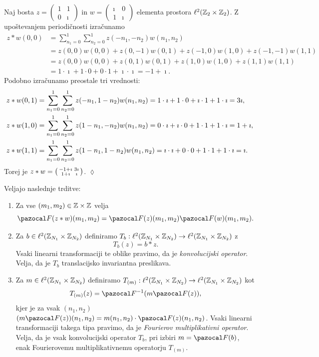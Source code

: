 \begin{primer}
Naj bosta
$z = \left(\begin{smallmatrix}
  1 & 1\\
  0 & \imath
\end{smallmatrix} \right)$
in
$w = \left(\begin{smallmatrix}
  \imath & 0\\
  1 & \imath
\end{smallmatrix} \right)$
elementa prostora $\ell^2(\mathbb Z_2 \times \mathbb Z_2)$. Z upoštevanjem periodičnosti izračunamo
%
\begin{align*}
z \ast w(0, 0) & = \sum_{n_1 = 0}^1 \sum_{n_2 = 0}^1 z(- n_1, - n_2) w(n_1, n_2) \\
& = z(0, 0) w(0, 0) + z(0, -1) w(0, 1) + z(-1, 0) w(1, 0)+ z(-1, -1) w(1, 1) \\
& = z(0, 0) w(0, 0) + z(0, 1) w(0, 1) + z(1, 0) w(1, 0)+ z(1, 1) w(1, 1) \\
& = 1 \cdot \imath + 1 \cdot 0 + 0 \cdot 1 + \imath \cdot \imath = -1 + \imath.
\end{align*}
%
Podobno izračunamo preostale tri vrednosti:
%
\begin{align*}
z \ast w(0, 1) & = \sum_{n_1 = 0}^1 \sum_{n_2 = 0}^1 z(- n_1, 1 - n_2) w(n_1, n_2) = 1 \cdot \imath + 1 \cdot 0 + \imath \cdot 1 + 1 \cdot \imath = 3\imath, \\
z \ast w(1, 0) & = \sum_{n_1 = 0}^1 \sum_{n_2 = 0}^1 z(1 - n_1, - n_2) w(n_1, n_2) = 0 \cdot \imath + \imath \cdot 0 + 1 \cdot 1 + 1 \cdot \imath = 1 + \imath, \\
z \ast w(1, 1) & = \sum_{n_1 = 0}^1 \sum_{n_2 = 0}^1 z(1 - n_1, 1 - n_2) w(n_1, n_2) = \imath \cdot \imath + 0 \cdot 0 + 1 \cdot 1 + 1 \cdot \imath = \imath.
\end{align*}
%
Torej je
$z \ast w = \left(\begin{smallmatrix}
  -1 + \imath & 3\imath\\
  1 + \imath & \imath
\end{smallmatrix} \right)$. \hfill $\lozenge$
\end{primer}
%
\begin{izrek}
Veljajo naslednje trditve:
\begin{enumerate}
\item Za vse $(m_1, m_2) \in \mathbb Z \times \mathbb Z$ velja
$$\F(z \ast w)(m_1, m_2) = \F(z)(m_1, m_2) \F(w)(m_1, m_2).$$
\item Za $b \in \ell^2(\mathbb Z_{N_1} \times \mathbb Z_{N_2})$ definiramo $T_b : \ell^2(\mathbb Z_{N_1} \times \mathbb Z_{N_2}) \to \ell^2(\mathbb Z_{N_1} \times \mathbb Z_{N_2})$ z
$$T_b(z) = b \ast z.$$
Vsaki linearni transformaciji te oblike pravimo, da je \emph{konvolucijski operator}. Velja, da je $T_b$ translacijsko invariantna preslikava.
\item Za $m \in \ell^2(\mathbb Z_{N_1} \times \mathbb Z_{N_2})$ definiramo $T_{(m)} : \ell^2(\mathbb Z_{N_1} \times \mathbb Z_{N_2}) \to \ell^2(\mathbb Z_{N_1} \times \mathbb Z_{N_2})$ kot
$$T_{(m)}(z) = \F^{-1}(m\F(z)),$$
kjer je za vsak $(n_1, n_2)$ $(m\F(z))(n_1, n_2) = m(n_1, n_2) \cdot \F(z)(n_1, n_2)$. Vsaki linearni transformaciji takega tipa pravimo, da je \emph{Fourierov multiplikativni operator}. Velja, da je vsak konvolucijski operator $T_b$, pri izbiri $m = \F(b)$, enak Fourierovemu multiplikativnemu operatorju $T_{(m)}$.
\end{enumerate}
\end{izrek}
